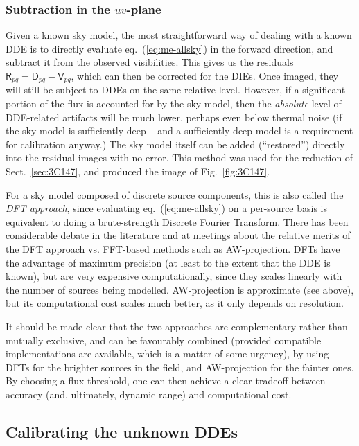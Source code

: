 \documentclass[]{aa}
\newcommand{\coh}[2]{\mathsf{{#1}}_{{#2}}}
\begin{document}
\subsubsection{Subtraction in the $uv$-plane\label{sec:subtraction-uv-plane}}

Given a known sky model, the most straightforward way of dealing with a known DDE is to directly evaluate eq.~(\ref{eq:me-allsky}) in the forward direction, and subtract it from the observed visibilities. This gives us the residuals $\coh{R}{pq} = \coh{D}{pq} - \coh{V}{pq}$, which can then be corrected for the DIEs. Once imaged, they will still be subject to DDEs on the same relative level. However, if a significant portion of the flux is accounted for by the sky model, then the \emph{absolute} level of DDE-related artifacts will be much lower, perhaps even below thermal noise (if the sky model is sufficiently deep -- and a sufficiently deep model is a requirement for calibration anyway.) The sky model itself can be added (``restored'') directly into the residual images with no error. This method was used for the reduction of Sect.~\ref{sec:3C147}, and produced the image of Fig.~\ref{fig:3C147}.

For a sky model composed of discrete source components, this is also called the \emph{DFT approach}, since evaluating eq.~(\ref{eq:me-allsky}) on a per-source basis is equivalent to doing a brute-strength Discrete Fourier Transform. There has been considerable debate in the literature and at meetings about the relative merits of the DFT approach vs. FFT-based methods such as AW-projection. DFTs have the advantage of maximum precision (at least to the extent that the DDE is known), but are very expensive computationally, since they scales linearly with the number of sources being modelled. AW-projection is approximate (see above), but its computational cost scales much better, as it only depends on resolution.

It should be made clear that the two approaches are complementary rather than mutually exclusive, and can be favourably combined (provided compatible implementations are available, which is a matter of some urgency), by using DFTs for the brighter sources in the field, and AW-projection for the fainter ones. By choosing a flux threshold, one can then achieve a clear tradeoff between accuracy (and, ultimately, dynamic range) and computational cost. 

\subsection{Calibrating the unknown DDEs}
\end{document}
